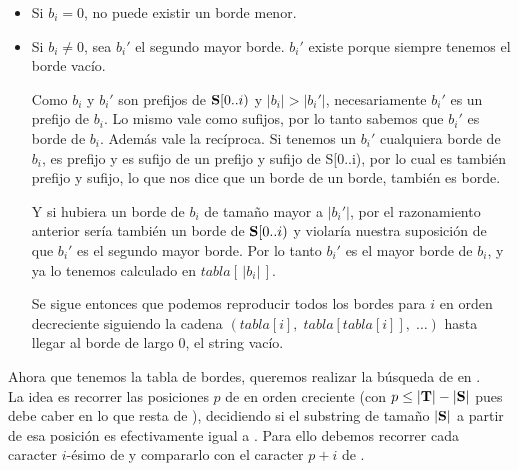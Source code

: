 \begin{itemize}
    \item Si $b_i = 0$, no puede existir un borde menor.
    \item Si $b_i \neq 0$, sea $b_i'$ el segundo mayor borde. $b_i'$ existe porque siempre tenemos el borde vacío.

        Como $b_i$ y $b_i'$ son prefijos de $\textbf{S}[0..i)$ y $|b_i| > |b_i'|$, necesariamente $b_i'$ es un prefijo de $b_i$. Lo mismo vale como sufijos, por lo tanto sabemos que $b_i'$ es borde de $b_i$.
        Además vale la recíproca. Si tenemos un $b_i'$ cualquiera borde de $b_i$, es prefijo y es sufijo de un prefijo y sufijo de S[0..i), por lo cual es también prefijo y sufijo, lo que nos dice que un borde de un borde, también es borde.

        Y si hubiera un borde de $b_i$ de tamaño mayor a $|b_i'|$, por el razonamiento anterior sería también un borde de $\textbf{S}[0..i)$ y violaría nuestra suposición de que $b_i'$ es el segundo mayor borde. Por lo tanto $b_i'$ es el mayor borde de $b_i$, y ya lo tenemos calculado en $tabla[ \,|b_i|\, ]$.

        Se sigue entonces que podemos reproducir todos los bordes para $i$ en orden decreciente siguiendo la cadena $(tabla[i], \; tabla[tabla[i]], \; \ldots)$ hasta llegar al borde de largo 0, el string vacío.

\end{itemize}

\vspace*{1em}

Ahora que tenemos la tabla de bordes, queremos realizar la búsqueda de \sS en \sT.
\\

La idea es recorrer las posiciones $p$ de \sT en orden creciente (con $p \leq |\textbf{T}| - |\textbf{S}|$ pues \sS debe caber en lo que resta de \sT), decidiendo si el substring de tamaño $|\textbf{S}|$ a partir de esa posición es efectivamente igual a \sS. Para ello debemos recorrer cada caracter $i$-ésimo de \sS y compararlo con el caracter $p+i$ de \sT.

